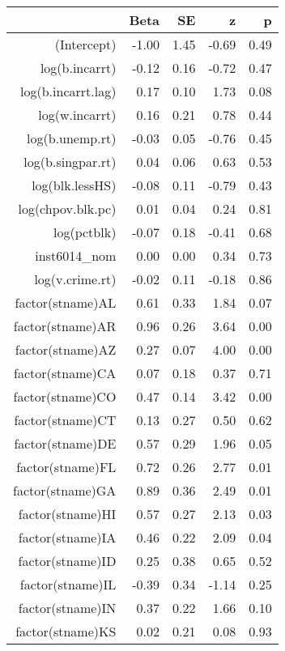 \begin{table}[ht]
\centering
\begin{tabular}{rrrrr}
  \hline
 & Beta & SE & z & p \\ 
  \hline
(Intercept) & -1.00 & 1.45 & -0.69 & 0.49 \\ 
  log(b.incarrt) & -0.12 & 0.16 & -0.72 & 0.47 \\ 
  log(b.incarrt.lag) & 0.17 & 0.10 & 1.73 & 0.08 \\ 
  log(w.incarrt) & 0.16 & 0.21 & 0.78 & 0.44 \\ 
  log(b.unemp.rt) & -0.03 & 0.05 & -0.76 & 0.45 \\ 
  log(b.singpar.rt) & 0.04 & 0.06 & 0.63 & 0.53 \\ 
  log(blk.lessHS) & -0.08 & 0.11 & -0.79 & 0.43 \\ 
  log(chpov.blk.pc) & 0.01 & 0.04 & 0.24 & 0.81 \\ 
  log(pctblk) & -0.07 & 0.18 & -0.41 & 0.68 \\ 
  inst6014\_nom & 0.00 & 0.00 & 0.34 & 0.73 \\ 
  log(v.crime.rt) & -0.02 & 0.11 & -0.18 & 0.86 \\ 
  factor(stname)AL & 0.61 & 0.33 & 1.84 & 0.07 \\ 
  factor(stname)AR & 0.96 & 0.26 & 3.64 & 0.00 \\ 
  factor(stname)AZ & 0.27 & 0.07 & 4.00 & 0.00 \\ 
  factor(stname)CA & 0.07 & 0.18 & 0.37 & 0.71 \\ 
  factor(stname)CO & 0.47 & 0.14 & 3.42 & 0.00 \\ 
  factor(stname)CT & 0.13 & 0.27 & 0.50 & 0.62 \\ 
  factor(stname)DE & 0.57 & 0.29 & 1.96 & 0.05 \\ 
  factor(stname)FL & 0.72 & 0.26 & 2.77 & 0.01 \\ 
  factor(stname)GA & 0.89 & 0.36 & 2.49 & 0.01 \\ 
  factor(stname)HI & 0.57 & 0.27 & 2.13 & 0.03 \\ 
  factor(stname)IA & 0.46 & 0.22 & 2.09 & 0.04 \\ 
  factor(stname)ID & 0.25 & 0.38 & 0.65 & 0.52 \\ 
  factor(stname)IL & -0.39 & 0.34 & -1.14 & 0.25 \\ 
  factor(stname)IN & 0.37 & 0.22 & 1.66 & 0.10 \\ 
  factor(stname)KS & 0.02 & 0.21 & 0.08 & 0.93 \\ 

\end{tabular}
\end{table}
